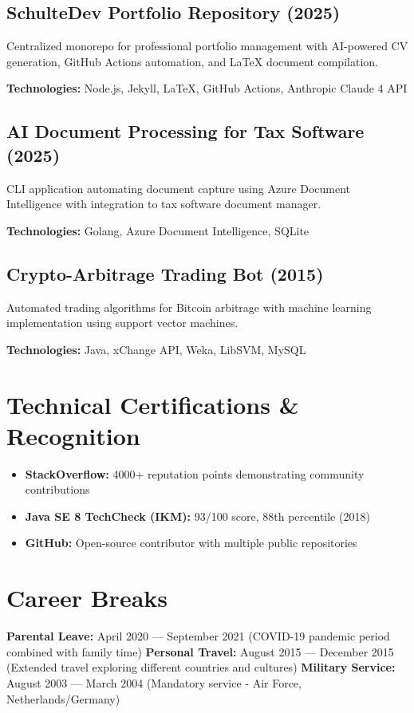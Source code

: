 \documentclass[10pt,a4paper]{article}
\begin{document}
\subsection{SchulteDev Portfolio Repository (2025)}
Centralized monorepo for professional portfolio management with AI-powered CV generation, GitHub Actions automation, and LaTeX document compilation.

\textbf{Technologies:} Node.js, Jekyll, LaTeX, GitHub Actions, Anthropic Claude 4 API

\subsection{AI Document Processing for Tax Software (2025)}
CLI application automating document capture using Azure Document Intelligence with integration to tax software document manager.

\textbf{Technologies:} Golang, Azure Document Intelligence, SQLite

\subsection{Crypto-Arbitrage Trading Bot (2015)}
Automated trading algorithms for Bitcoin arbitrage with machine learning implementation using support vector machines.

\textbf{Technologies:} Java, xChange API, Weka, LibSVM, MySQL

\section{Technical Certifications \& Recognition}

\begin{itemize}
\item \textbf{StackOverflow:} 4000+ reputation points demonstrating community contributions
\item \textbf{Java SE 8 TechCheck (IKM):} 93/100 score, 88th percentile (2018)
\item \textbf{GitHub:} Open-source contributor with multiple public repositories
\end{itemize}

\section{Career Breaks}

\textbf{Parental Leave:} April 2020 — September 2021 (COVID-19 pandemic period combined with family time)  
\textbf{Personal Travel:} August 2015 — December 2015 (Extended travel exploring different countries and cultures)  
\textbf{Military Service:} August 2003 — March 2004 (Mandatory service - Air Force, Netherlands/Germany)
\end{document}
